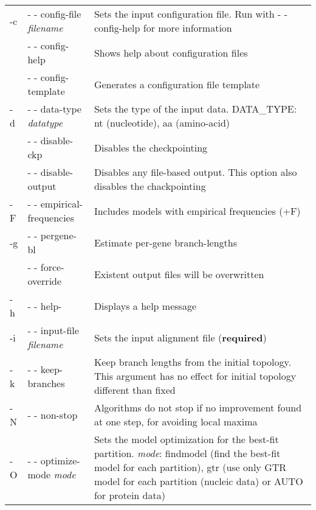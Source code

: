 \documentclass[11pt,twoside,a4paper]{article}
\begin{document}
\begin{flushleft}
\renewcommand{\arraystretch}{1.5}
\small {
\begin{tabular}{@{}llp{.7\linewidth}@{}}
-c & - - config-file {\it filename}
   &   Sets the input configuration file. Run with - - config-help for more information \\

 &- - config-help 
 &      Shows help about configuration files \\

 & - - config-template 
 &      Generates a configuration file template \\

-d& - - data-type {\it datatype} 
  &     Sets the type of the input data. DATA\_TYPE: nt (nucleotide), aa (amino-acid) \\

  &- - disable-ckp 
  &     Disables the checkpointing \\

  &- - disable-output 
  &     Disables any file-based output. This option also disables the chackpointing\\

-F & - - empirical-frequencies
   &    Includes models with empirical frequencies (+F) \\

-g& - - pergene-bl
  &     Estimate per-gene branch-lengths \\

&- - force-override
&Existent output files will be overwritten \\

-h& - - help-
  &     Displays a help message \\

-i& - - input-file {\it filename}
  &     Sets the input alignment file ({\bf required}) \\

-k& - - keep-branches
  &     Keep branch lengths from the initial topology. This argument has no effect for initial topology different than fixed \\

-N& - - non-stop
  &     Algorithms do not stop if no improvement found at one step, for avoiding local maxima \\

-O& - - optimize-mode {\it mode}
  &     Sets  the  model optimization for the best-fit partition. {\it mode}: findmodel (find the best-fit model for each partition), gtr (use only GTR model for each partition (nucleic data)
or AUTO for protein data) \\


\end{tabular}}
\end{flushleft}
\end{document}
